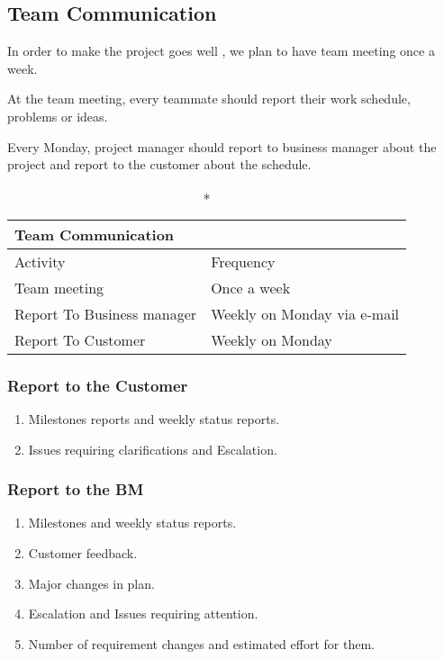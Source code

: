 \documentclass[a4paper,11pt]{article}
\begin{document}
\subsection{Team Communication}
In order to make the project goes well , we plan to have team meeting once a week.

At the team meeting, every teammate should report their work schedule, problems or ideas.

Every Monday, project manager should report to business manager about the project and report to the customer about the schedule. 

\begin{center}
\begin{longtable}{|l|l|}
\caption*{Team Communication} \\
\hline Activity                   & Frequency \\
\hline Team meeting               & Once a week \\
\hline Report To Business manager & Weekly on Monday via e-mail \\
\hline Report To Customer         & Weekly on Monday \\
\hline 
\end{longtable}
\end{center}

\subsubsection{Report to the Customer}
\begin{enumerate}
\item Milestones reports and weekly status reports.
\item Issues requiring clarifications and Escalation.
\end{enumerate}

\subsubsection{Report to the BM}
\begin{enumerate}
\item Milestones and weekly status reports.
\item Customer feedback.
\item Major changes in plan.
\item Escalation and Issues requiring attention.
\item Number of requirement changes and estimated effort for them.
\end{enumerate}
\end{document}

